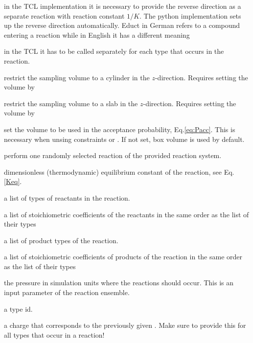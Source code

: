  in the TCL implementation it is necessary to provide the reverse direction as a separate reaction with reaction constant $1/K$. The python implementation sets up the reverse direction automatically. Educt in German refers to a compound entering a reaction while in English
it has a different meaning

 in the TCL it has to be called separately for each type that occurs in the reaction.

 restrict the sampling volume to a cylinder in the $z$-direction. 
Requires setting the volume by 

 restrict the sampling volume to a slab in the $z$-direction.
Requires setting the volume by 

 set the volume to be used in the acceptance probability,
Eq.\ref{eq:Pacc}. This is necessary when unsing constraints  or
. If not set, box volume is used by default.

 perform one randomly selected reaction of the provided reaction system.

  \begin{arguments}
  \item[\var{K}] dimensionless (thermodynamic) equilibrium constant of the reaction, see Eq.\ref{Keq}. 
\item[\var{list\_reactant\_types}] a list of types of reactants in the reaction.
\item[\var{list\_reactant\_coefficients}] a list of stoichiometric coefficients of the reactants 
	in the same order as the list of their types
\item[\var{list\_product\_types}] a list of product types of the reaction.
\item[\var{list\_product\_coefficients}] a list of stoichiometric coefficients of products of the reaction
	in the same order as the list of their types
\item[\var{desired\_pressure\_at\_which\_reactions\_occur}] the pressure in simulation units where the reactions should occur. This is an input parameter of the reaction ensemble.
\item[\var{type}] a type id.
\item[\var{charge}] a charge that corresponds to the previously given . Make sure to provide this for all types that occur in a reaction!
  \end{arguments}
  
